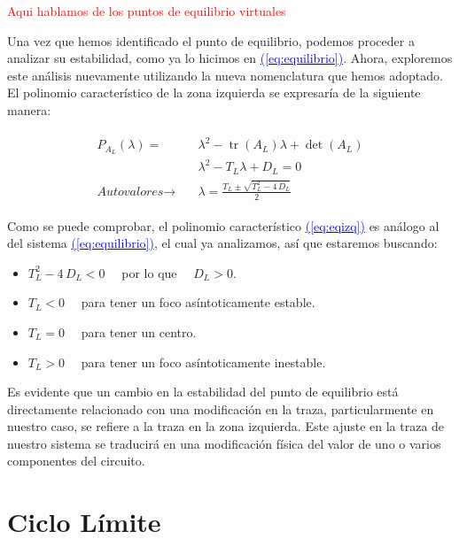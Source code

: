 \documentclass[12pt,a4paper]{report} %
\newcommand{\eref}[1]{\hyperref[#1]{\textcolor{blue}{(\ref*{#1})}}}
\newcommand{\eref}[1]{\hyperref[#1]{\textcolor{blue}{\textit{(\ref*{#1})}}}}
\newcommand{\tr}{\operatorname{\textrm{tr}}}
\begin{document}
		\textcolor{red}{Aqui hablamos de los puntos de equilibrio virtuales}
		
		\newpage
		
		\vspace{0.5cm} Una vez que hemos identificado el punto de equilibrio, podemos proceder a analizar su estabilidad, como ya lo hicimos en \eref{eq:equilibrio}. Ahora, exploremos este análisis nuevamente utilizando la nueva nomenclatura que hemos adoptado. El polinomio característico de la zona izquierda se expresaría de la siguiente manera:
		
		\begin{eqnarray}
			\label{eq:eqizq}
			\begin{aligned}
				P_{A_L}(\lambda)=&\lambda^2-\tr(A_L)\lambda+\det(A_L) \\[1mm]
				&\lambda^2-T_L\lambda+D_L=0 \\[2mm]
				\textit{Autovalores}\rightarrow \quad &\lambda=\frac{T_L\pm \sqrt{T_L^2-4\,D_L}}{2}
			\end{aligned}
		\end{eqnarray}\smallskip

		\vspace{0.5cm}Como se puede comprobar, el polinomio característico \eref{eq:eqizq} es análogo al del sistema \eref{eq:equilibrio}, el cual ya analizamos, así que estaremos buscando:
		
		\vspace{0.2cm}\begin{itemize}
			\item $T_L^2-4\,D_L<0\quad$ por lo que $\quad D_L>0$.
			\item $T_L<0\quad$ para tener un foco asíntoticamente estable.
			\item $T_L=0\quad$ para tener un centro.
			\item $T_L>0\quad$ para tener un foco asíntoticamente inestable.
		\end{itemize}\smallskip
		
		\vspace{1cm}Es evidente que un cambio en la estabilidad del punto de equilibrio está directamente relacionado con una modificación en la traza, particularmente en nuestro caso, se refiere a la traza en la zona izquierda. Este ajuste en la traza de nuestro sistema se traducirá en una modificación física del valor de uno o varios componentes del circuito.
		
		\vspace{1cm}\section{Ciclo Límite}
		
\end{document}
